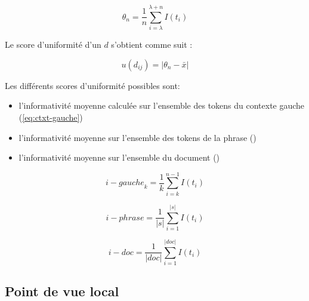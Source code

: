 \documentclass{article}
\begin{document}
\begin{equation}
    \theta_n = \frac{1}{n} \sum^{\lambda+n}_{i = \lambda} I(t_i)
\end{equation}

Le score d'uniformité d'un $d$ s'obtient comme suit :

\begin{equation}
    u(d_{ij}) = |\theta_n - \bar{x}|
\end{equation}





Les différents scores d'uniformité possibles sont: 

\begin{itemize}
    \item l'informativité moyenne calculée sur l'ensemble des tokens du contexte gauche (\ref{eq:ctxt-gauche})
    \item l'informativité moyenne sur l'ensemble des tokens de la phrase ()
    \item l'informativité moyenne sur l'ensemble du document ()
\end{itemize}

\begin{equation}
\label{eq:ctxt-gauche} 
    \mathit{i-gauche}_{k} = \frac{1}{k} \sum^{n-1}_{i = k} I(t_i)
\end{equation}
 
\begin{equation}
    i-phrase = \frac{1}{|s|} \sum^{|s|}_{i = 1} I(t_i)
\end{equation}

\begin{equation}
    i-doc = \frac{1}{|doc|} \sum^{|doc|}_{i = 1} I(t_i)
\end{equation}

\subsection{Point de vue local}
\end{document}
